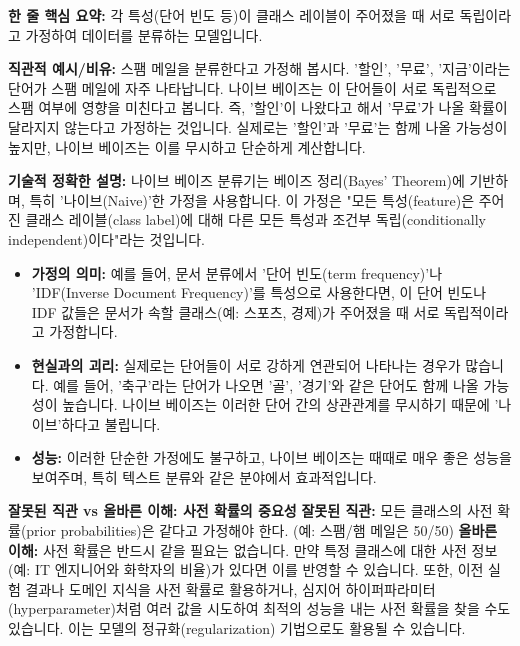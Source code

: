 \documentclass[11pt,a4paper]{article}
\begin{document}
\begin{conceptbox}
\textbf{한 줄 핵심 요약:} 각 특성(단어 빈도 등)이 클래스 레이블이 주어졌을 때 서로 독립이라고 가정하여 데이터를 분류하는 모델입니다.
\end{conceptbox}

\textbf{직관적 예시/비유:}
스팸 메일을 분류한다고 가정해 봅시다. '할인', '무료', '지금'이라는 단어가 스팸 메일에 자주 나타납니다. 나이브 베이즈는 이 단어들이 서로 독립적으로 스팸 여부에 영향을 미친다고 봅니다. 즉, '할인'이 나왔다고 해서 '무료'가 나올 확률이 달라지지 않는다고 가정하는 것입니다. 실제로는 '할인'과 '무료'는 함께 나올 가능성이 높지만, 나이브 베이즈는 이를 무시하고 단순하게 계산합니다.

\textbf{기술적 정확한 설명:}
나이브 베이즈 분류기는 베이즈 정리(Bayes' Theorem)에 기반하며, 특히 '나이브(Naive)'한 가정을 사용합니다. 이 가정은 "모든 특성(feature)은 주어진 클래스 레이블(class label)에 대해 다른 모든 특성과 조건부 독립(conditionally independent)이다"라는 것입니다.

\begin{itemize}
    \item \textbf{가정의 의미:} 예를 들어, 문서 분류에서 '단어 빈도(term frequency)'나 'IDF(Inverse Document Frequency)'를 특성으로 사용한다면, 이 단어 빈도나 IDF 값들은 문서가 속할 클래스(예: 스포츠, 경제)가 주어졌을 때 서로 독립적이라고 가정합니다.
    \item \textbf{현실과의 괴리:} 실제로는 단어들이 서로 강하게 연관되어 나타나는 경우가 많습니다. 예를 들어, '축구'라는 단어가 나오면 '골', '경기'와 같은 단어도 함께 나올 가능성이 높습니다. 나이브 베이즈는 이러한 단어 간의 상관관계를 무시하기 때문에 '나이브'하다고 불립니다.
    \item \textbf{성능:} 이러한 단순한 가정에도 불구하고, 나이브 베이즈는 때때로 매우 좋은 성능을 보여주며, 특히 텍스트 분류와 같은 분야에서 효과적입니다.
\end{itemize}

\begin{warningbox}
\textbf{잘못된 직관 vs 올바른 이해: 사전 확률의 중요성}
\textbf{잘못된 직관:} 모든 클래스의 사전 확률(prior probabilities)은 같다고 가정해야 한다. (예: 스팸/햄 메일은 50/50)
\textbf{올바른 이해:} 사전 확률은 반드시 같을 필요는 없습니다. 만약 특정 클래스에 대한 사전 정보(예: IT 엔지니어와 화학자의 비율)가 있다면 이를 반영할 수 있습니다. 또한, 이전 실험 결과나 도메인 지식을 사전 확률로 활용하거나, 심지어 하이퍼파라미터(hyperparameter)처럼 여러 값을 시도하여 최적의 성능을 내는 사전 확률을 찾을 수도 있습니다. 이는 모델의 정규화(regularization) 기법으로도 활용될 수 있습니다.
\end{warningbox}
\end{document}
